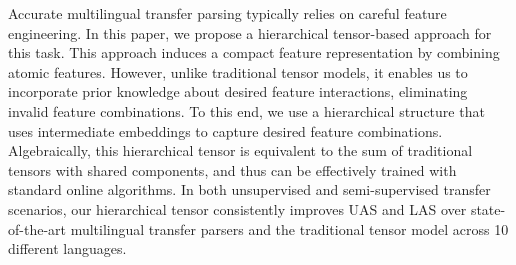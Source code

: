 Accurate multilingual transfer parsing typically relies on careful feature engineering. In this paper, we propose a hierarchical tensor-based approach for this task. This approach induces a compact feature representation by combining atomic features. However, unlike traditional tensor models, it enables us to incorporate prior knowledge about desired feature interactions, eliminating invalid feature combinations. To this end, we use a hierarchical structure that uses intermediate embeddings to capture desired feature combinations. Algebraically, this hierarchical tensor is equivalent to the sum of traditional tensors with shared components, and thus can be effectively trained with standard online algorithms. In both unsupervised and semi-supervised transfer scenarios, our hierarchical tensor consistently improves UAS and LAS over state-of-the-art multilingual transfer parsers and the traditional tensor model across 10 different languages.
